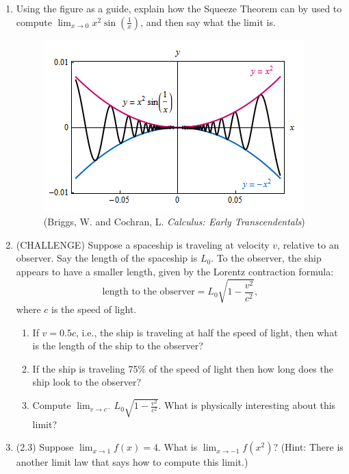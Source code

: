 \documentclass[11pt,letterpaper]{article}
\begin{document}
\begin{enumerate}
\item Using the figure as a guide, explain how the Squeeze Theorem can by used to compute $\lim_{x\to 0}x^2\sin(\frac{1}{x})$, and then say what the limit is.
\vspace{-1pc}  
\begin{figure}[h]
\begin{center}
\includegraphics[scale=0.8]{Exam1pic2.png}
\caption{(Briggs, W. and Cochran, L. \emph{Calculus: Early Transcendentals})}
\end{center}
\end{figure}

\item (CHALLENGE) Suppose a spaceship is traveling at velocity $v$, relative to an observer.  Say the length of the spaceship is $L_0$.  To the observer, the ship appears to have a smaller length, given by the Lorentz contraction formula:
\[\text{length to the observer}=L_0\sqrt{1-\frac{v^2}{c^2}},\]
where $c$ is the speed of light.
\begin{enumerate}
\item If $v=0.5c$, i.e., the ship is traveling at half the speed of light, then what is the length of the ship to the observer?
\item If the ship is traveling 75\% of the speed of light then how long does the ship look to the observer?
\item Compute $\lim_{v\to c^-}L_0\sqrt{1-\frac{v^2}{c^2}}$.  What is physically interesting about this limit?
\end{enumerate}

\item (2.3) Suppose $\lim_{x\to 1}f(x)=4$.  What is $\lim_{x\to -1}f(x^2)$?  (Hint: There is another limit law that says how to compute this limit.)


\end{enumerate}
\end{document}
